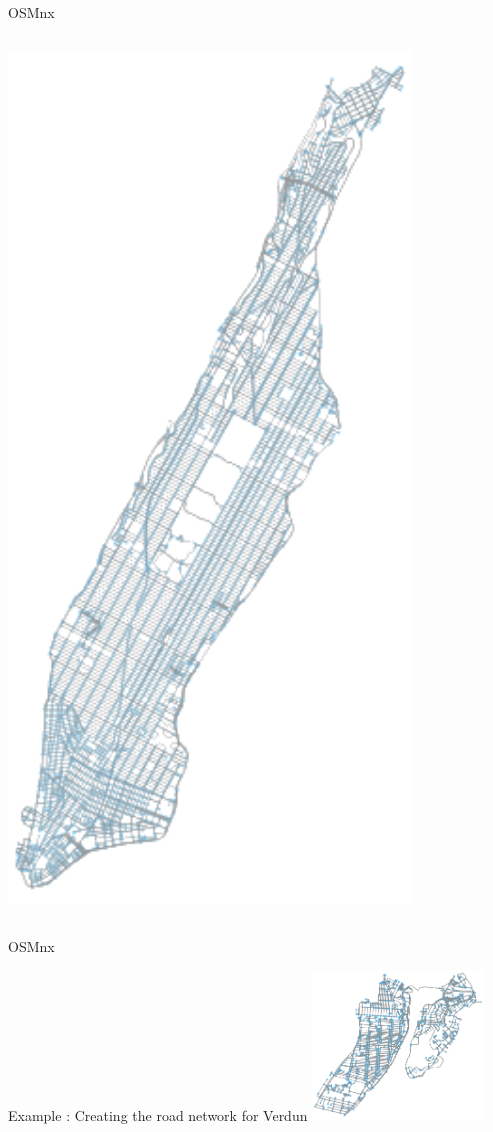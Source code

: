 \documentclass[aspectratio=169]{beamer}
\begin{document}
\begin{frame}{OSMnx \cite{boeing2017osmnx}}
\begin{columns}
\begin{column}{0.25\textwidth}
\begin{center}
     \includegraphics[width=0.8\textwidth]{figures/osmnx_manhattan}
     \end{center}
\end{column}
\end{columns}
\end{frame}

\begin{frame}{OSMnx \cite{boeing2017osmnx}}

{\Large Example : Creating the road network for Verdun}
{\small }
\centering
\includegraphics[height=4cm]{figures/verdun_network}

\end{frame}
\end{document}
